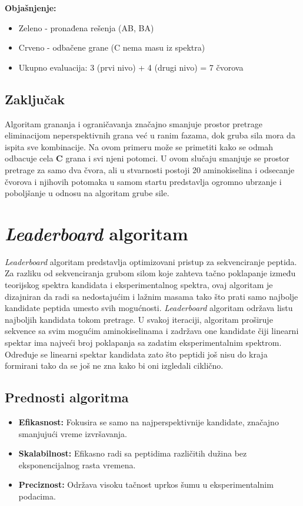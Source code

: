 \documentclass[12pt,oneside]{memoir}
\begin{document}
\textbf{Objašnjenje:}
\begin{itemize}
    \item \textcolor{green!50!black}{Zeleno} - pronađena rešenja (AB, BA)
    \item \textcolor{red!50!black}{Crveno} - odbačene grane (C nema masu iz spektra)
    \item Ukupno evaluacija: 3 (prvi nivo) + 4 (drugi nivo) = 7 čvorova
\end{itemize}

\subsection{Zaključak}

Algoritam grananja i ograničavanja značajno smanjuje prostor pretrage eliminacijom neperspektivnih grana već u ranim fazama, dok gruba sila mora da ispita sve kombinacije.
Na ovom primeru može se primetiti kako se odmah odbacuje cela \textbf{C} grana i svi njeni potomci. U ovom slučaju smanjuje se prostor pretrage za samo dva čvora, ali u stvarnosti postoji 20 aminokiselina i odsecanje čvorova i njihovih potomaka u samom startu predstavlja ogromno ubrzanje i poboljšanje u odnosu na algoritam grube sile.

\section{\emph{Leaderboard} algoritam}
\emph{Leaderboard} algoritam \cite{online_lecture, online_book} predstavlja optimizovani pristup za sekvenciranje peptida. Za razliku od sekvenciranja grubom silom koje zahteva tačno poklapanje između teorijskog spektra kandidata i eksperimentalnog spektra, ovaj algoritam je dizajniran da radi sa nedostajućim i lažnim masama tako što prati samo najbolje kandidate peptida umesto svih mogućnosti.
\emph{Leaderboard} algoritam održava listu najboljih kandidata tokom pretrage. U svakoj iteraciji, algoritam proširuje sekvence sa svim mogućim aminokiselinama i zadržava one kandidate čiji linearni spektar ima najveći broj poklapanja sa zadatim eksperimentalnim spektrom.
Određuje se linearni spektar kandidata zato što peptidi još nisu do kraja formirani tako da se još ne zna kako bi oni izgledali ciklično.

\subsection{Prednosti algoritma}

\begin{itemize}
    \item \textbf{Efikasnost:} Fokusira se samo na najperspektivnije kandidate, značajno smanjujući vreme izvršavanja.
    \item \textbf{Skalabilnost:} Efikasno radi sa peptidima različitih dužina bez eksponencijalnog rasta vremena.
    \item \textbf{Preciznost:} Održava visoku tačnost uprkos šumu u eksperimentalnim podacima.
\end{itemize}
\end{document}
